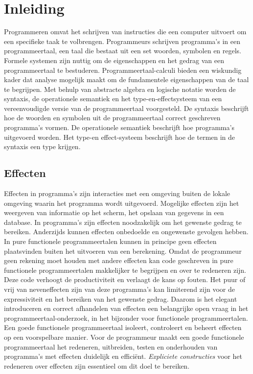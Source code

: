 \chapter{Inleiding} \label{inleiding}
Programmeren omvat het schrijven van instructies die een computer uitvoert om een specifieke taak te volbrengen. Programmeurs schrijven programma's in een programmeertaal, een taal die bestaat uit een set woorden, symbolen en regels. Formele systemen zijn nuttig om de eigenschappen en het gedrag van een programmeertaal te bestuderen. Programmeertaal-calculi bieden een wiskundig kader dat analyse mogelijk maakt om de fundamentele eigenschappen van de taal te begrijpen. Met behulp van abstracte algebra en logische notatie worden de syntaxis, de operationele semantiek en het type-en-effectsysteem van een vereenvoudigde versie van de programmeertaal voorgesteld. De syntaxis beschrijft hoe de woorden en symbolen uit de programmeertaal correct geschreven programma's vormen. De operationele semantiek beschrijft hoe programma's uitgevoerd worden. Het type-en effect-systeem beschrijft hoe de termen in de syntaxis een type krijgen.  

\section{Effecten}
Effecten in programma's zijn interacties met een omgeving buiten de lokale omgeving waarin het programma wordt uitgevoerd. Mogelijke effecten zijn het weergeven van informatie op het scherm, het opslaan van gegevens in een database. In programma's zijn effecten noodzakelijk om het gewenste gedrag te bereiken. Anderzijds kunnen effecten onbedoelde en ongewenste gevolgen hebben. In pure functionele programmeertalen kunnen in principe geen effecten plaatsvinden buiten het uitvoeren van een berekening. Omdat de programmeur geen rekening moet houden met andere effecten kan code geschreven in pure functionele programmeertalen makkelijker te begrijpen en over te redeneren zijn. Deze code verhoogt de productiviteit en verlaagt de kans op fouten. Het puur of vrij van neveneffecten zijn van deze programma's kan limiterend zijn voor de expressiviteit en  het bereiken van het gewenste gedrag. Daarom is het elegant introduceren en correct afhandelen van effecten een belangrijke open vraag in het programmeertaal-onderzoek, in het bijzonder voor functionele programmeertalen. Een goede functionele programmeertaal isoleert, controleert en beheert effecten op een voorspelbare manier. Voor de programmeur maakt een goede functionele programmeertaal het redeneren, uitbreiden, testen en onderhouden van programma's met effecten duidelijk en efficiënt. \emph{Expliciete constructies} voor het redeneren over effecten zijn essentieel om dit doel te bereiken. \newline

